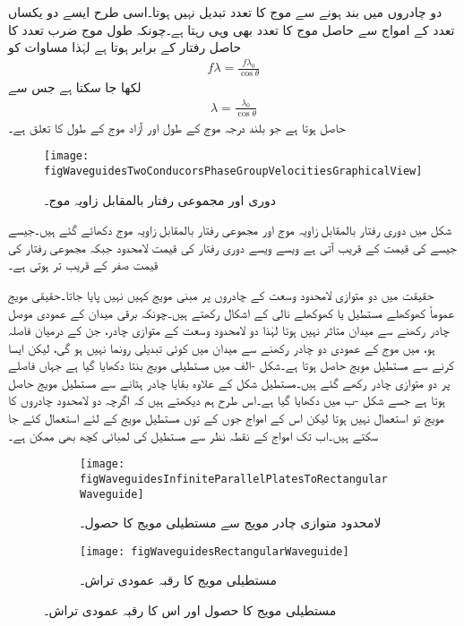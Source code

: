 دو چادروں میں بند ہونے سے  موج کا تعدد تبدیل نہیں ہوتا۔اسی طرح ایسے دو یکساں تعدد کے امواج سے حاصل  موج کا تعدد بھی وہی رہتا ہے۔چونکہ طول موج ضرب تعدد کا حاصل رفتار کے برابر ہوتا ہے لہٰذا مساوات  کو
\begin{align*}
f \lambda=\frac{f \lambda_0}{\cos \theta}
\end{align*}
لکھا جا سکتا ہے جس سے
\begin{align*}
\lambda=\frac{\lambda_0}{\cos \theta}
\end{align*}
حاصل ہوتا ہے جو بلند درجہ موج کے طول  اور آزاد موج کے طول  کا تعلق ہے۔

\begin{figure}
\centering
\texttt{[image: figWaveguidesTwoConducorsPhaseGroupVelocitiesGraphicalView]}
\caption{دوری اور مجموعی رفتار بالمقابل زاویہ موج۔}
\label{شکل_مویج_دوری_مجموعی_رفتار_بالمقابل_زاویہ}
\end{figure} 

شکل  میں دوری رفتار بالمقابل زاویہ موج اور مجموعی رفتار بالمقابل زاویہ موج دکھائے گئے ہیں۔جیسے جیسے  کی قیمت  کے قریب آتی ہے ویسے ویسے دوری رفتار کی قیمت لامحدود جبکہ مجموعی رفتار کی قیمت صفر کے قریب تر ہوتی ہے۔

حقیقت میں دو متوازی لامحدود وسعت کے چادروں پر مبنی مویج کہیں نہیں پایا جاتا۔حقیقی مویج عموماً کھوکھلے مستطیل یا کھوکھلے نالی کے اشکال رکھتے ہیں۔چونکہ برقی میدان کے عمودی موصل چادر رکھنے سے میدان متاثر نہیں ہوتا لہٰذا دو لامحدود وسعت کے متوازی چادر، جن کے درمیان فاصلہ  ہو، میں  موج کے عمودی دو چادر رکھنے سے  میدان میں کوئی تبدیلی رونما نہیں ہو گی، لیکن ایسا کرنے سے مستطیل مویج حاصل ہوتا ہے۔شکل -الف میں مستطیلی مویج بنتا  دکھایا گیا ہے جہاں  فاصلے پر دو متوازی چادر رکھے گئے ہیں۔مستطیل شکل کے علاوہ بقایا چادر ہٹانے سے مستطیل مویج حاصل ہوتا ہے جسے شکل -ب میں دکھایا گیا ہے۔اس طرح ہم دیکھتے ہیں کہ اگرچہ دو لامحدود چادروں کا مویج تو استعمال نہیں ہوتا لیکن اس کے  امواج جوں کے توں مستطیل مویج کے لئے استعمال کئے جا سکتے ہیں۔اب تک  امواج کے نقطہ نظر سے مستطیل کی  لمبائی کچھ بھی ممکن ہے۔

\begin{figure}
\centering
\begin{subfigure}{0.4\textwidth}
\centering
\texttt{[image: figWaveguidesInfiniteParallelPlatesToRectangularWaveguide]}
\caption{لامحدود متوازی چادر مویج سے مستطیلی مویج کا حصول۔}
\label{شکل_مویج_حصول_مستطیل}
\end{subfigure}%
%
\begin{subfigure}{0.4\textwidth}
\centering
\texttt{[image: figWaveguidesRectangularWaveguide]}
\caption{مستطیلی مویج کا رقبہ عمودی تراش۔}
\label{شکل_مویج_رقبہ_عمودی_تراش_مستطیل}
\end{subfigure}
\caption{مستطیلی مویج کا حصول اور اس کا رقبہ عمودی تراش۔}
\label{شکل_مویج_مستطیل}
\end{figure}

